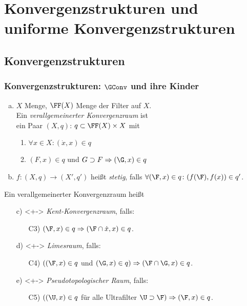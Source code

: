 
\section{Konvergenzstrukturen und uniforme Konvergenzstrukturen}

\subsection{Konvergenzstrukturen}
\begin{frame}
  \frametitle{Konvergenzstrukturen: $\GConv$ und ihre Kinder}

  \begin{enumerate}[a)]
    \item $X$ Menge, $\FF(X)$ Menge der Filter auf $X$. \\
      Ein \emph{verallgemeinerter Konvergenzraum} ist \\
      ein Paar $(X,q)$: $q \subset \FF(X) \times X$ mit
      \begin{enumerate}[C1)]
        \item $\forall x \in X\colon (\dot x, x) \in q$ 
        \item  $(F,x) \in q$ und $G \supset F \Rightarrow (\G, x) \in q$
      \end{enumerate}
    \item $f \colon (X,q) \to (X',q')$ heißt \emph{stetig}, falls $\forall (\F,x) \in q \colon (f(\F), f(x)) \in q'$.
  \end{enumerate}
  \pause
  Ein verallgemeinerter Konvergenzraum heißt
  \begin{enumerate}[a)]
    \item[c)]<+-> \emph{Kent-Konvergenzraum}, falls:
      \begin{enumerate}
        \item[C3)] $(\F, x) \in q \Rightarrow (\F \cap \dot x, x) \in q$.
      \end{enumerate}
    \item[d)]<+-> \emph{Limesraum}, falls:
      \begin{enumerate}
        \item[C4)] $((\F,x) \in q$ und $(\G,x) \in q) \Rightarrow (\F \cap \G, x) \in q$.
      \end{enumerate}
    \item[e)]<+-> \emph{Pseudotopologischer Raum}, falls:
      \begin{enumerate}
        \item[C5)] $((\U, x) \in q$ für alle Ultrafilter $\U \supset \F) \Rightarrow (\F,x) \in q$.

\end{enumerate}
\end{enumerate}
\end{frame}
